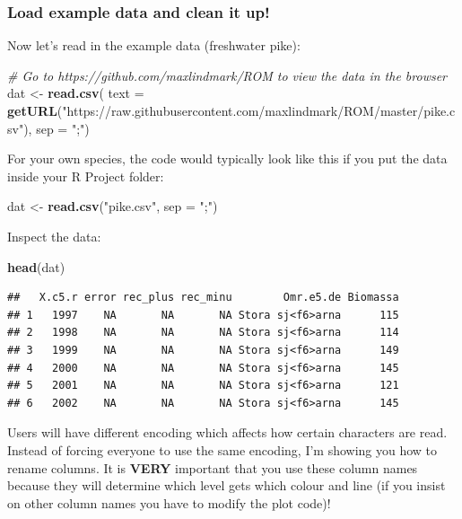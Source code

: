 \documentclass[]{article}
\newenvironment{Shaded}{\begin{snugshade}}{\end{snugshade}}
\newcommand{\KeywordTok}[1]{\textcolor[rgb]{0.13,0.29,0.53}{\textbf{#1}}}
\newcommand{\DataTypeTok}[1]{\textcolor[rgb]{0.13,0.29,0.53}{#1}}
\newcommand{\StringTok}[1]{\textcolor[rgb]{0.31,0.60,0.02}{#1}}
\newcommand{\CommentTok}[1]{\textcolor[rgb]{0.56,0.35,0.01}{\textit{#1}}}
\newcommand{\NormalTok}[1]{#1}
\begin{document}
\subsubsection{Load example data and clean it
up!}\label{load-example-data-and-clean-it-up}

Now let's read in the example data (freshwater pike):

\begin{Shaded}
\begin{Highlighting}[]
\CommentTok{# Go to https://github.com/maxlindmark/ROM to view the data in the browser}
\NormalTok{dat <-}\StringTok{ }\KeywordTok{read.csv}\NormalTok{(}
  \DataTypeTok{text =} \KeywordTok{getURL}\NormalTok{(}\StringTok{"https://raw.githubusercontent.com/maxlindmark/ROM/master/pike.csv"}\NormalTok{), }
  \DataTypeTok{sep =} \StringTok{";"}\NormalTok{)}
\end{Highlighting}
\end{Shaded}

For your own species, the code would typically look like this if you put
the data inside your R Project folder:

\begin{Shaded}
\begin{Highlighting}[]
\NormalTok{dat <-}\StringTok{ }\KeywordTok{read.csv}\NormalTok{(}\StringTok{"pike.csv"}\NormalTok{, }\DataTypeTok{sep =} \StringTok{";"}\NormalTok{)}
\end{Highlighting}
\end{Shaded}

Inspect the data:

\begin{Shaded}
\begin{Highlighting}[]
\KeywordTok{head}\NormalTok{(dat)}
\end{Highlighting}
\end{Shaded}

\begin{verbatim}
##   X.c5.r error rec_plus rec_minu        Omr.e5.de Biomassa
## 1   1997    NA       NA       NA Stora sj<f6>arna      115
## 2   1998    NA       NA       NA Stora sj<f6>arna      114
## 3   1999    NA       NA       NA Stora sj<f6>arna      149
## 4   2000    NA       NA       NA Stora sj<f6>arna      145
## 5   2001    NA       NA       NA Stora sj<f6>arna      121
## 6   2002    NA       NA       NA Stora sj<f6>arna      145
\end{verbatim}

Users will have different encoding which affects how certain characters
are read. Instead of forcing everyone to use the same encoding, I'm
showing you how to rename columns. It is \textbf{VERY} important that
you use these column names because they will determine which level gets
which colour and line (if you insist on other column names you have to
modify the plot code)!
\end{document}
